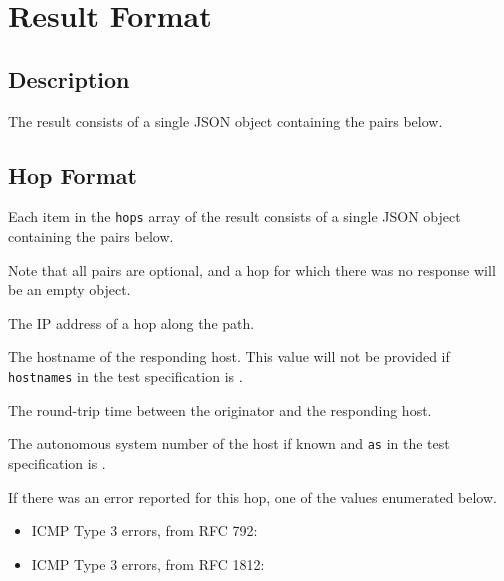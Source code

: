\documentclass[10pt]{article}
\begin{document}
%
%

\section{Result Format}

\subsection{Description}
The result consists of a single JSON object containing the pairs
below.  \seejson


\subsection{Hop Format}

Each item in the {\tt hops} array of the result consists of a single
JSON object containing the pairs below.  \seejson

Note that  all pairs are  optional, and a  hop for which there  was no
response will be an empty object.

 The IP address of a hop along the path.

 The hostname of the responding host.  This
value will not be provided if {\tt hostnames} in the test
specification is \false.

 The round-trip time between the originator
and the responding host.

 The autonomous system number of the host if
known and {\tt as} in the test specification is \true.

 If there was an error reported for this hop,
one of the values enumerated below.

\begin{itemize}
\item ICMP Type 3 errors, from RFC 792:

\item ICMP Type 3 errors, from RFC 1812:
\end{itemize}
\end{document}
